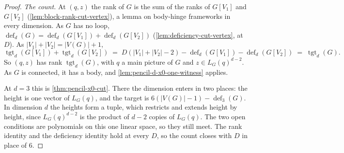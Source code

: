 \begin{proof}
  \emph{The count.} At $(q, z)$ the rank of $G$ is the sum of the ranks of
  $G[V_1]$ and $G[V_2]$ (\cref{lem:block-rank-cut-vertex}), a lemma on
  body-hinge frameworks in every dimension. As $G$ has no loop,
  $\operatorname{def}_d(G) = \operatorname{def}_d(G[V_1]) +
  \operatorname{def}_d(G[V_2])$ (\cref{lem:deficiency-cut-vertex}, at
  $D$). As $|V_1| + |V_2| = |V(G)| + 1$,
  \[
    \operatorname{tgt}_d(G[V_1]) + \operatorname{tgt}_d(G[V_2])
    \;=\; D(|V_1| + |V_2| - 2) - \operatorname{def}_d(G[V_1])
    - \operatorname{def}_d(G[V_2])
    \;=\; \operatorname{tgt}_d(G).
  \]
  So $(q, z)$ has rank $\operatorname{tgt}_d(G)$, with $q$ a main picture
  of $G$ and $z \in L_G(q)^{d-2}$. As $G$ is connected, it has a body, and
  \cref{lem:pencil-d-x0-one-witness} applies.

  At $d = 3$ this is \cref{thm:pencil-x0-cut}. There the dimension enters
  in two places: the height is one vector of $L_G(q)$, and the target is
  $6(|V(G)| - 1) - \operatorname{def}_3(G)$. In dimension $d$ the heights
  form a tuple, which restricts and extends height by height, since
  $L_G(q)^{d-2}$ is the product of $d - 2$ copies of $L_G(q)$. The two
  open conditions are polynomials on this one linear space, so they still
  meet. The rank identity and the deficiency identity hold at every $D$,
  so the count closes with $D$ in place of $6$.
\end{proof}

